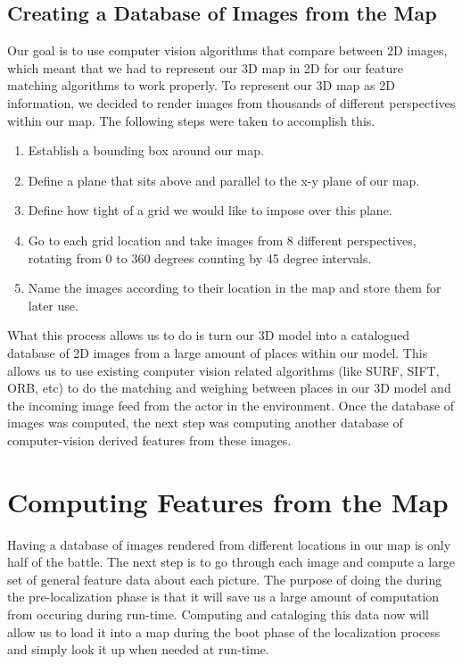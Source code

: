 \documentclass[a4paper,11pt]{article}
\begin{document}
  \subsection{Creating a Database of Images from the Map}
  Our goal is to use computer vision algorithms that compare between 2D images, which meant that we had to represent our 3D map in 2D for our feature matching algorithms to work properly. To represent our 3D map as 2D information, we decided to render images from thousands of different perspectives within our map. The following steps were taken to accomplish this.
  \begin{enumerate}
  \item Establish a bounding box around our map.
  \item Define a plane that sits above and parallel to the x-y plane of our map.
  \item Define how tight of a grid we would like to impose over this plane.
  \item Go to each grid location and take images from 8 different perspectives, rotating from 0 to 360 degrees counting by 45 degree intervals.
  \item Name the images according to their location in the map and store them for later use.
  \end{enumerate}

  What this process allows us to do is turn our 3D model into a catalogued database of 2D images from a large amount of places within our model. This allows us to use existing computer vision related algorithms (like SURF, SIFT, ORB, etc) to do the matching and weighing between places in our 3D model and the incoming image feed from the actor in the environment. 
  Once the database of images was computed, the next step was computing another database of computer-vision derived features from these images.




  \section{Computing Features from the Map}
  Having a database of images rendered from different locations in our map is only half of the battle. The next step is to go through each image and compute a large set of general feature data about each picture. The purpose of doing the during the pre-localization phase is that it will save us a large amount of computation from occuring during run-time. Computing and cataloging this data now will allow us to load it into a map during the boot phase of the localization process and simply look it up when needed at run-time.
\end{document}

